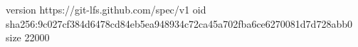 version https://git-lfs.github.com/spec/v1
oid sha256:9c027cf384d6478cd84eb5ea948934c72ca45a702fba6ce6270081d7d728abb0
size 22000
